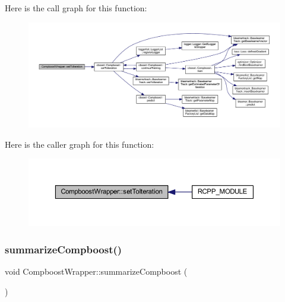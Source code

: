 Here is the call graph for this function\+:\nopagebreak
\begin{figure}[H]
\begin{center}
\leavevmode
\includegraphics[width=350pt]{class_compboost_wrapper_a3f8ebe1d821b3bfa5e6d0d04beff0211_cgraph}
\end{center}
\end{figure}
Here is the caller graph for this function\+:\nopagebreak
\begin{figure}[H]
\begin{center}
\leavevmode
\includegraphics[width=350pt]{class_compboost_wrapper_a3f8ebe1d821b3bfa5e6d0d04beff0211_icgraph}
\end{center}
\end{figure}
\mbox{\label{class_compboost_wrapper_aa656658dec0c8396f4bea7c4049ed264}} 
\subsubsection{\texorpdfstring{summarize\+Compboost()}{summarizeCompboost()}}
{\footnotesize\ttfamily void Compboost\+Wrapper\+::summarize\+Compboost (\begin{DoxyParamCaption}{ }\end{DoxyParamCaption})\hspace{0.3cm}{\ttfamily [inline]}}

